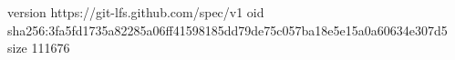 version https://git-lfs.github.com/spec/v1
oid sha256:3fa5fd1735a82285a06ff41598185dd79de75c057ba18e5e15a0a60634e307d5
size 111676
